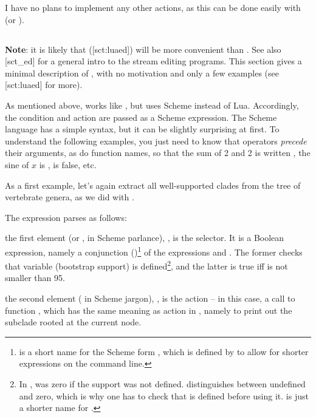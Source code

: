 I have no plans to implement any other actions, as this can be done easily
with \luaed{} (or \sched).

\subsection{\sched}

\textbf{Note}: it is likely that \luaed{} (\in{}[sct:luaed]) will be more
convenient than \sched. See also [sct_ed] for a general intro to the
stream editing programs. This section gives a minimal description of \sched,
with no motivation and only a few examples (see \in{}[sct:luaed] for more).

As mentioned above, \sched{} works like \luaed{}, but uses Scheme
instead of Lua. Accordingly, the condition and action are passed as a Scheme
expression. The Scheme language has a simple syntax, but it can
be slightly surprising at first. To understand the following examples, you just
need to know that operators {\em precede} their arguments, as do function
names, so that the sum of 2 and 2 is written , the sine of $x$
is ,  is false, etc.

As a first example, let's again extract all
well-supported clades from the tree of vertebrate genera, as we did with \luaed.

\page[no]


The expression  parses as follows:
\startitemize
	\item the first element (or , in Scheme parlance),
	, is the selector.  It is a Boolean
	expression, namely a conjunction (\code{\&})\footnote{\code{\&} is
	a short name for the Scheme form , which is defined by
	\sched{} to allow for shorter expressions on the command line.} of the
	expressions  and .  The former
	checks that variable  (bootstrap support) is
	defined\footnote{In \ed,  was zero if the support was not
	defined. \sched{} distinguishes between undefined and zero, which is
	why one has to check that  is defined before using it.
	 is just a shorter name for .}, and the
	latter is true iff  is not smaller than 95.
	\item the second element ( in Scheme jargon),
	, is the action -- in this case, a call to function
	, which has the same meaning as action  in \ed,
	namely to print out the subclade rooted at the current node.
\stopitemize

